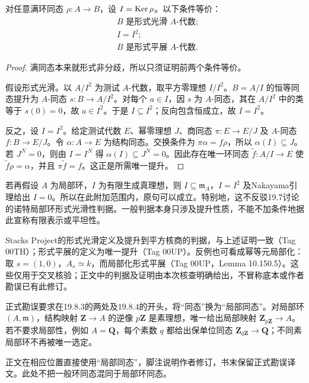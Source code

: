 对任意满环同态 $\rho:A\to B$，设 $I=\operatorname{Ker}\rho$。以下条件等价：
\[
\begin{aligned}
 &B\text{ 是形式光滑 }A\text{-代数};\\
 &I=I^2;\\
 &B\text{ 是形式平展 }A\text{-代数}.
\end{aligned}
\]
\begin{proof}
满同态本来就形式非分歧，所以只须证明前两个条件等价。

假设形式光滑。以 $A/I^2$ 为测试 $A$-代数，取平方零理想 $I/I^2$。$B=A/I$ 的恒等同态提升为 $A$-同态 $s:B\to A/I^2$。对每个 $a\in I$，因 $s$ 为 $A$-同态，其在 $A/I^2$ 中的类等于 $s(0)=0$，故 $a\in I^2$。于是 $I\subseteq I^2$；反向包含恒成立，故 $I=I^2$。

反之，设 $I=I^2$。给定测试代数 $E$、幂零理想 $J$、商同态 $\pi:E\to E/J$ 及 $A$-同态 $f:B\to E/J$。令 $\alpha:A\to E$ 为结构同态。交换条件为 $\pi\alpha=f\rho$，所以 $\alpha(I)\subseteq J$。若 $J^N=0$，则由 $I=I^N$ 得 $\alpha(I)\subseteq J^N=0$。因此存在唯一环同态 $\widetilde f:A/I\to E$ 使 $\widetilde f\rho=\alpha$，并且 $\pi\widetilde f=f$。这正是所需唯一提升。
\end{proof}

若再假设 $A$ 为局部环，$I$ 为有限生成真理想，则 $I\subseteq\mathfrak m_A$，$I=I^2$ 及Nakayama引理给出 $I=0$。所以在此附加范围内，原句可以成立。特别地，这不反驳19.7讨论的诺特局部环形式光滑性判据。一般判据本身只涉及提升性质，不能不加条件地据此宣称有限表示或平坦性。

Stacks Project的形式光滑定义及提升到平方核商的判据，与上述证明一致（Tag 00TH）；形式平展的定义为唯一提升（Tag 00UP）。反例也可看成幂等元局部化：取 $s=(1,0)$，$A_s\simeq k$，而局部化形式平展（Tag 00UP，Lemma 10.150.5）。这些仅用于交叉核验；正文中的判据及证明由本次核查明确给出，不冒称底本或作者勘误已有此修订。

正式勘误要求在19.8.3的两处及19.8.4的开头，将“同态”换为“局部同态”。对局部环 $(A,\mathfrak m)$，结构映射 $\mathbf Z\to A$ 的逆像 $p\mathbf Z$ 是素理想，唯一给出局部映射 $\mathbf Z_{p\mathbf Z}\to A$。若不要求局部性，例如 $A=\mathbf Q$，每个素数 $q$ 都给出保单位同态 $\mathbf Z_{q\mathbf Z}\to\mathbf Q$；不同素局部环不再被唯一选定。

正文在相应位置直接使用“局部同态”，脚注说明作者修订，书末保留正式勘误译文。此处不把一般环同态混同于局部环同态。

